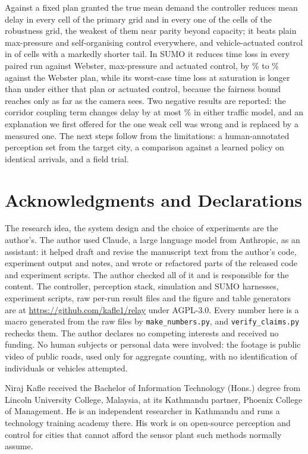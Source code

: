 \documentclass[journal]{IEEEtran}
\begin{document}
Against a fixed plan granted the true mean demand the controller reduces mean delay in every cell of the
primary grid and in every one of the \GridCells{} cells of the robustness grid, the weakest of them near
parity beyond capacity; it beats plain max-pressure and self-organising control everywhere, and vehicle-actuated
control in \PolActuatedWins{} of \GridCells{} cells with a markedly shorter tail. In SUMO it reduces time loss
in every paired run against Webster, max-pressure and actuated control, by \SumoWebsterMin\% to
\SumoWebsterMax\% against the Webster plan, while its worst-case time loss at saturation is longer than under either that plan or actuated control, because the fairness bound reaches only as far as the camera sees. Two negative results are reported: the corridor coupling term changes delay by at most
\ScorrCoupleAbsMax\% in either traffic model, and an explanation we first offered for
the one weak cell was wrong and is replaced by a measured one. The next steps follow from the limitations: a
human-annotated perception set from the target city, a comparison against a learned policy on identical
arrivals, and a field trial.

\section*{Acknowledgments and Declarations}

The research idea, the system design and the choice of experiments are the author's. The author used
Claude, a large language model from Anthropic, as an assistant: it helped draft and revise the manuscript
text from the author's code, experiment output and notes, and wrote or refactored parts of the released code
and experiment scripts. The author checked all of it and is responsible for the content. The controller,
perception stack, simulation and SUMO harnesses, experiment scripts, raw per-run result files and the figure
and table generators are at \url{https://github.com/kafle1/relay} under AGPL-3.0. Every number here is a
macro generated from the raw files by \texttt{make\_numbers.py}, and \texttt{verify\_claims.py} rechecks
them. The author declares no competing interests and received no funding. No human subjects or
personal data were involved: the footage is public video of public roads, used only for aggregate counting,
with no identification of individuals or vehicles attempted.




\begin{IEEEbiographynophoto}{Niraj Kafle}
received the Bachelor of Information Technology (Hons.) degree from Lincoln University College, Malaysia,
at its Kathmandu partner, Phoenix College of Management. He is an independent researcher in Kathmandu and
runs a technology training academy there. His work is on open-source perception and control for cities that
cannot afford the sensor plant such methods normally assume.
\end{IEEEbiographynophoto}
\end{document}
